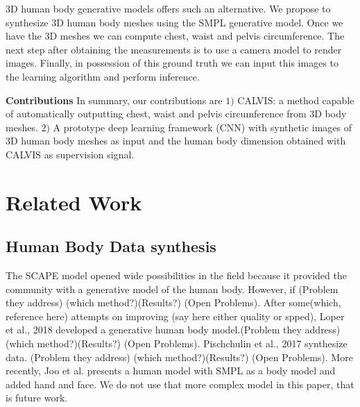 \documentclass[runningheads, orivec]{llncs}
\begin{document}
3D human body generative models offers such an alternative. We propose to 
synthesize 3D human body meshes using the SMPL \cite{Loper.2015} generative 
model. Once we have 
the 3D meshes we can compute chest, waist and pelvis circumference. The next 
step after obtaining the 
measurements is to use a camera model to render
images. Finally, in possession of this ground truth we can 
input this images to the learning algorithm and perform inference.

\textbf{Contributions} In summary, our contributions are $1)$ CALVIS: a method 
capable of automatically outputting chest, waist and pelvis circumference from 
3D body meshes. $2)$ A prototype deep learning framework (CNN) with synthetic 
images of 3D human body meshes as input and the human body dimension obtained 
with CALVIS as supervision signal.

\section{Related Work}\label{sec:rel_work}

\subsection{Human Body Data synthesis}
The \cite{Anguelov.2005} SCAPE model opened wide possibilities in the field  
because it provided the community with a generative model of the human 
body. However, if (Problem they address) (which method?)(Results?) (Open 
Problems).
After some(which, reference here) attempts on improving (say here either 
quality or spped), Loper et al., 2018 \cite{Loper.2015} developed a generative 
human body model.(Problem they address) (which method?)(Results?) (Open 
Problems).
Pischchulin et al., 2017 \cite{Pishchulin.2017} synthesize data. (Problem they 
address) (which method?)(Results?) (Open Problems).
More recently, Joo et al. \cite{Joo.2018} presents a human model with SMPL as a 
body model and added hand and face. We do not use that more complex model in 
this paper, that is future work.
\end{document}
